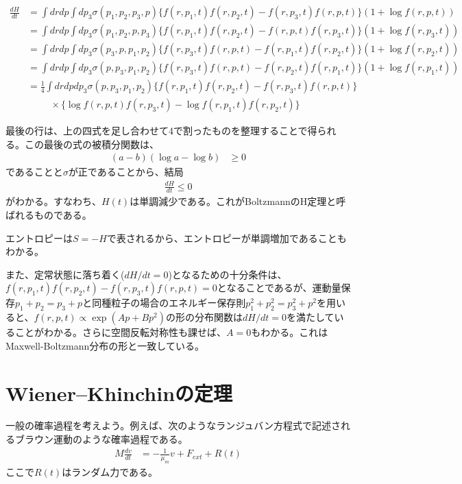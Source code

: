 \documentclass[uplatex,dvipdfmx]{jsarticle}
\begin{document}
\begin{align}
    \frac{dH}{dt} &= \int drdp \int dp_3 \sigma(p_1,p_2,p_3,p) \{f(r,p_1,t)f(r,p_2,t)-f(r, p_3, t)f(r, p,t)\}(1+\log f(r,p,t)) \\ 
        &= \int drdp \int dp_3 \sigma(p_1,p_2,p,p_3) \{f(r,p_1,t)f(r,p_2,t)-f(r, p, t)f(r, p_3,t)\}(1+\log f(r,p_3,t)) \\
        &= \int drdp \int dp_3 \sigma(p_3,p,p_1,p_2) \{f(r,p_3,t)f(r,p,t)-f(r, p_1, t)f(r, p_2,t)\}(1+\log f(r,p_2,t)) \\
        &= \int drdp \int dp_3 \sigma(p,p_3,p_1,p_2) \{f(r,p_3,t)f(r,p,t)-f(r, p_2, t)f(r, p_1,t)\}(1+\log f(r,p_1,t)) \\
        &= \frac{1}{4} \int drdpdp_3 \sigma(p,p_3,p_1,p_2)
            \{ f(r,p_1,t)f(r,p_2,t) - f(r,p_3,t)f(r,p,t) \} \\
        & \hspace{1cm} \times \{\log f(r,p,t)f(r,p_3,t)- \log f(r,p_1,t)f(r,p_2,t)\}
\end{align}

最後の行は、上の四式を足し合わせて4で割ったものを整理することで得られる。この最後の式の被積分関数は、
\begin{align*}
    (a-b)(\log a-\log b) &\geq 0 
\end{align*}
であることと$\sigma$が正であることから、結局
\begin{align}
    \frac{dH}{dt} \leq 0    
\end{align}
がわかる。すなわち、$H(t)$は単調減少である。これがBoltzmannのH定理と呼ばれるものである。

エントロピーは$S=-H$で表されるから、エントロピーが単調増加であることもわかる。

また、定常状態に落ち着く($dH/dt = 0$)となるための十分条件は、$f(r,p_1,t)f(r,p_2,t) - f(r,p_3,t)f(r,p,t)=0 $となることであるが、運動量保存$p_1+p_2 = p_3 + p$と同種粒子の場合のエネルギー保存則$p_1^2+p_2^2 = p_3^2+p^2$を用いると、$f(r,p,t)\propto \exp(Ap+Bp^2)$の形の分布関数は$dH/dt=0$を満たしていることがわかる。さらに空間反転対称性も課せば、$A=0$もわかる。これはMaxwell-Boltzmann分布の形と一致している。

\section{Wiener–Khinchinの定理}
一般の確率過程を考えよう。例えば、次のようなランジュバン方程式で記述されるブラウン運動のような確率過程である。
\begin{align}
    M\frac{dv}{dt} &= -\frac{1}{\mu_m} v + F_{ext} + R(t) \label{eq:langevin}
\end{align}
ここで$R(t)$はランダム力である。
\end{document}
